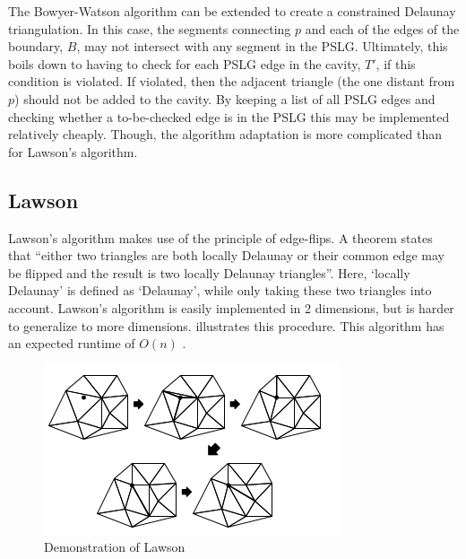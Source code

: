 The Bowyer-Watson algorithm can be extended to create a constrained Delaunay triangulation.
In this case, the segments connecting $p$ and each of the edges of the boundary, $B$, may not
intersect with any segment in the PSLG.
Ultimately, this boils down to having to check for each PSLG edge in the cavity, $T'$, if this condition is violated.
If violated, then the adjacent triangle (the one distant from $p$) should not be added to the cavity.
By keeping a list of all PSLG edges and checking whether a to-be-checked edge is in the PSLG this may be implemented relatively cheaply.
Though, the algorithm adaptation is more complicated than for Lawson's algorithm.

\subsection{Lawson}
\label{sub:lawson}
Lawson's algorithm makes use of the principle of edge-flips.
A theorem states that ``either two triangles are both locally Delaunay or their common edge may be flipped
and the result is two locally Delaunay triangles''.
Here, `locally Delaunay' is defined as `Delaunay', while only taking these two triangles into account.
Lawson's algorithm is easily implemented in 2 dimensions, but is harder to generalize to more dimensions.
 illustrates this procedure.
This algorithm has an expected runtime of $O(n)$ \cite{shewchuk}.

\begin{figure}
    \includegraphics[width=\columnwidth]{../images/Lawson.png}
    \caption{Demonstration of Lawson}
    \label{fig:LawsonIllustration}
\end{figure}

